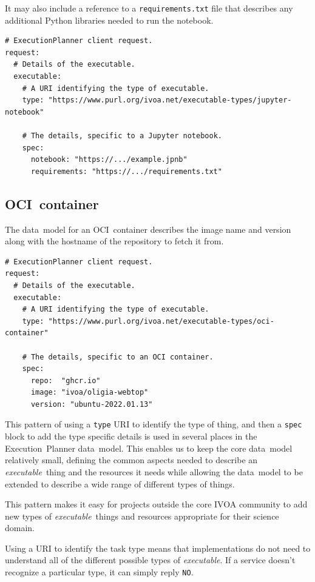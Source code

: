 \documentclass[11pt,a4paper]{ivoa}
\newcommand{\datamodel} {data~model}
\newcommand{\ivoa} {IVOA}
\newcommand{\executionplanner} {Execution~Planner}
\newcommand{\python} {Python}
\newcommand{\ocicontainer} {OCI~container}
\newcommand{\codeword}[1] {\texttt{#1}}
\newcommand{\executable} {\textit{executable}}
\newcommand{\executablething} {\textit{executable}~thing}
\begin{document}
It may also include a reference to a \codeword{requirements.txt} file that describes any additional \python{}
libraries needed to run the notebook.
\begin{lstlisting}[]
# ExecutionPlanner client request.
request:
  # Details of the executable.
  executable:
    # A URI identifying the type of executable.
    type: "https://www.purl.org/ivoa.net/executable-types/jupyter-notebook"

    # The details, specific to a Jupyter notebook.
    spec:
      notebook: "https://.../example.jpnb"
      requirements: "https://.../requirements.txt"
\end{lstlisting}

\subsection{\ocicontainer{}}
\label{ocicontainer}
The \datamodel{} for an \ocicontainer{} describes the image name and version
along with the hostname of the repository to fetch it from.

\begin{lstlisting}[]
# ExecutionPlanner client request.
request:
  # Details of the executable.
  executable:
    # A URI identifying the type of executable.
    type: "https://www.purl.org/ivoa.net/executable-types/oci-container"

    # The details, specific to an OCI container.
    spec:
      repo:  "ghcr.io"
      image: "ivoa/oligia-webtop"
      version: "ubuntu-2022.01.13"
\end{lstlisting}

This pattern of using a \codeword{type} URI to identify the type of thing, and then a
\codeword{spec} block to add the type specific details is used in several places in the
\executionplanner{} \datamodel{}.
This enables us to keep the core \datamodel{} relatively small, defining the common aspects
needed to describe an \executablething{} and the resources it needs while allowing the
\datamodel{} to be extended to describe a wide range of different types of things.

This pattern makes it easy for projects outside the core \ivoa{} community to add new
types of \executablething{}s and resources appropriate for their science domain.

Using a URI to identify the task type means that implementations do not need to understand
all of the different possible types of \executable{}.
If a service doesn’t recognize a particular type, it can simply reply \codeword{NO}.
\end{document}
